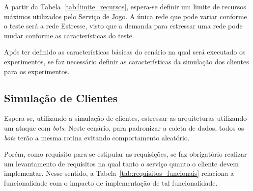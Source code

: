 A partir da Tabela~\ref{tab:limite_recursos}, espera-se definir um limite de recursos máximos utilizados pelo Serviço de Jogo.
%
A única rede que pode variar conforme o teste será a rede Estresse, visto que a demanda para estressar uma rede pode mudar conforme as características do teste.

Após ter definido as características básicas do cenário na qual será executado os experimentos, se faz necessário definir as características da simulação dos clientes para os experimentos.



\subsection{Simulação de Clientes}



Espera-se, utilizando a simulação de clientes, estressar as arquiteturas utilizando um ataque com \textit{bots}.
%
Neste cenário, para padronizar a coleta de dados, todos os \textit{bots} terão a mesma rotina evitando comportamento aleatório.



Porém, como requisito para se estipular as requisições, se faz obrigatório realizar um levantamento de requisitos na qual tanto o serviço quanto o cliente devem implementar.
%
Nesse sentido, a Tabela~\ref{tab:requisitos_funcionais} relaciona a funcionalidade com o impacto de implementação de tal funcionalidade.



